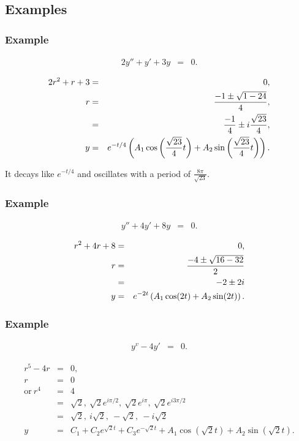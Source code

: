 \subsection{Examples}

\begin{frame}
  \frametitle{Example}

  \begin{eqnarray*}
    2y'' + y' + 3y & = & 0.
  \end{eqnarray*}
  
  {
    \begin{eqnarray*}
      2r^2+r+3 & = & 0, \\
      r & = & \frac{-1\pm\sqrt{1-24}}{4}, \\
      & = & \frac{-1}{4} \pm i\frac{\sqrt{23}}{4}, \\
      y & = & e^{-t/4} 
      \left( A_1 \cos\left( \frac{\sqrt{23}}{4} t \right) + A_2 \sin\left( \frac{\sqrt{23}}{4} t \right) \right).
    \end{eqnarray*}

    It decays like $e^{-t/4}$ and oscillates with a period of $\frac{8\pi}{\sqrt{23}}$.
  }

\end{frame}


\begin{frame}
  \frametitle{Example}

  \begin{eqnarray*}
    y'' + 4 y' + 8y & = & 0.
  \end{eqnarray*}

  {
    \begin{eqnarray*}
      r^2 + 4r + 8 & = & 0, \\
      r & = & \frac{-4\pm\sqrt{16-32}}{2} \\
      & = & -2 \pm 2i \\
      y & = & e^{-2t} \left( A_1 \cos(2t) + A_2 \sin(2t) \right).
    \end{eqnarray*}
  }

\end{frame}


\begin{frame}
  \frametitle{Example}

  \begin{eqnarray*}
    y^v - 4 y'& = & 0.
  \end{eqnarray*}

  {
    \begin{eqnarray*}
      r^5 - 4r & = & 0, \\
      r & = & 0 \\
      \mathrm{or~} r^4 & = & 4 \\
      & = & \sqrt{2},~\sqrt{2}e^{i \pi/2}, ~ \sqrt{2}e^{i \pi},~ \sqrt{2}e^{i 3\pi/2} \\
      & = & \sqrt{2},~i\sqrt{2},~-\sqrt{2},~-i\sqrt{2} \\
      y & = & C_1 + C_2 e^{\sqrt{2}t} + C_3 e^{-\sqrt{2}t} + 
      A_1 \cos(\sqrt{2}t) + A_2 \sin(\sqrt{2}t).
    \end{eqnarray*}
  }


\end{frame}

